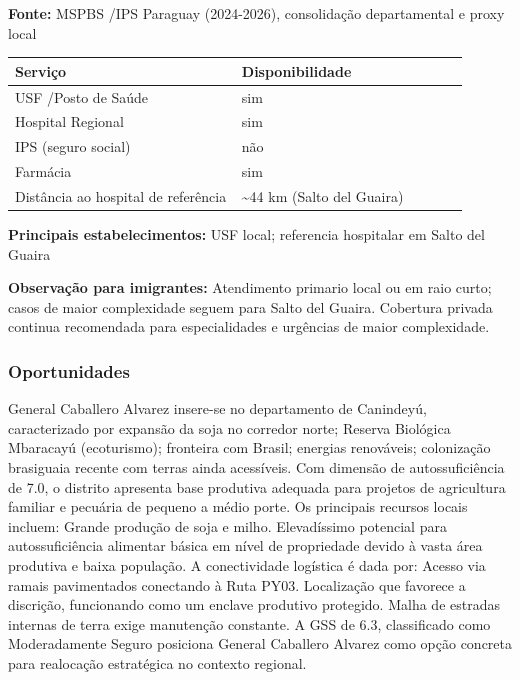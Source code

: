 \textbf{Fonte:} MSPBS /\allowbreak  IPS Paraguay (2024-2026), consolidação
departamental e proxy local

{\def\LTcaptype{none} %
\begin{longtable}{@{}>{\raggedright\arraybackslash}p{0.45\linewidth} >{\raggedright\arraybackslash}p{0.45\linewidth}@{}}
\toprule\noalign{}
Serviço & Disponibilidade \\
\midrule\noalign{}
\endhead
\bottomrule\noalign{}
\endlastfoot
USF /\allowbreak  Posto de Saúde & sim \\
Hospital Regional & sim \\
IPS (seguro social) & não \\
Farmácia & sim \\
Distância ao hospital de referência & \textasciitilde44 km (Salto del
Guaira) \\
\end{longtable}
}

\textbf{Principais estabelecimentos:} USF local; referencia hospitalar
em Salto del Guaira

\textbf{Observação para imigrantes:} Atendimento primario local ou em
raio curto; casos de maior complexidade seguem para Salto del Guaira.
Cobertura privada continua recomendada para especialidades e urgências
de maior complexidade.
\newpage

\subsubsection*{Oportunidades}\label{oport-general-caballero-alvarez-1411}
General Caballero Alvarez insere-se no departamento de Canindeyú, caracterizado por expansão da soja no corredor norte; Reserva Biológica Mbaracayú (ecoturismo); fronteira com Brasil; energias renováveis; colonização brasiguaia recente com terras ainda acessíveis. Com dimensão de autossuficiência de 7.0, o distrito apresenta base produtiva adequada para projetos de agricultura familiar e pecuária de pequeno a médio porte. Os principais recursos locais incluem: Grande produção de soja e milho. Elevadíssimo potencial para autossuficiência alimentar básica em nível de propriedade devido à vasta área produtiva e baixa população. A conectividade logística é dada por: Acesso via ramais pavimentados conectando à Ruta PY03. Localização que favorece a discrição, funcionando como um enclave produtivo protegido. Malha de estradas internas de terra exige manutenção constante. A GSS de 6.3, classificado como Moderadamente Seguro posiciona General Caballero Alvarez como opção concreta para realocação estratégica no contexto regional.

